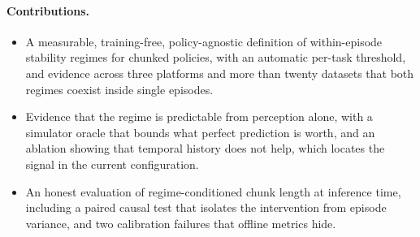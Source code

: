 \paragraph{Contributions.}
\begin{itemize}
\item A measurable, training-free, policy-agnostic definition of within-episode
stability regimes for chunked policies, with an automatic per-task threshold,
and evidence across three platforms and more than twenty datasets that both
regimes coexist inside single episodes.
\item Evidence that the regime is predictable from perception alone, with a
simulator oracle that bounds what perfect prediction is worth, and an ablation
showing that temporal history does not help, which locates the signal in the
current configuration.
\item An honest evaluation of regime-conditioned chunk length at inference
time, including a paired causal test that isolates the intervention from
episode variance, and two calibration failures that offline metrics hide.
\end{itemize}
